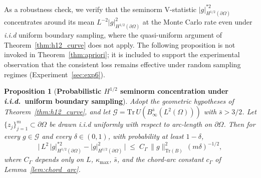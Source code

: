 \documentclass[11pt]{article}
\newtheorem{proposition}[theorem]{Proposition}
\begin{document}
As a robustness check, we verify that the seminorm V-statistic
$|g|^{*2}_{H^{1/2}(\partial\Omega)}$ concentrates around its mean
$L^{-2}|g|^2_{H^{1/2}(\partial\Omega)}$ at the Monte Carlo rate even
under {\em i.i.d} uniform boundary sampling, where the quasi-uniform
argument of Theorem~\ref{thm:h12_curve} does not apply. The
following proposition is not invoked in Theorem~\ref{thm:apriori};
it is included to support the experimental observation that the
consistent loss remains effective under random sampling regimes
(Experiment~\ref{sec:exp6}).
 
\begin{proposition}[\textbf{Probabilistic $H^{1/2}$ seminorm
concentration under {\em i.i.d.}\ uniform boundary
sampling}]\label{prop:h12_rejection}
Adopt the geometric hypotheses of Theorem~\ref{thm:h12_curve}, and let
$\mathcal{G} = \mathrm{Tr}\,U(B^{\bar{s}}_\infty(L^2(\Omega)))$ with
$\bar{s} > 3/2$. Let $\{z_j\}_{j=1}^{m} \subset \partial\Omega$ be
drawn {\em i.i.d} uniformly with respect to arc-length on
$\partial\Omega$. Then for every $g \in \mathcal{G}$ and every
$\delta \in (0,1)$, with probability at least $1-\delta$,
\begin{equation}\label{eq:prop5}
  \bigl|\,L^2\,|g|^{*2}_{H^{1/2}(\partial\Omega)}
        - |g|^2_{H^{1/2}(\partial\Omega)}\,\bigr|
  \;\le\; C_\Gamma\,\|g\|^2_{\mathrm{Tr}(B)}\,(m\delta)^{-1/2},
\end{equation}
where $C_\Gamma$ depends only on $L$, $\kappa_{\max}$, $\bar{s}$, and
the \textit{chord-arc} constant $c_\Gamma$ of
Lemma~\ref{lem:chord_arc}.
\end{proposition}
 
\end{document}
